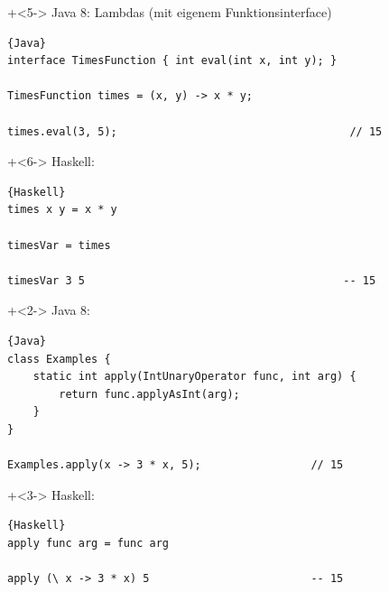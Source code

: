 \begin{frame}[fragile]{}
\onslide+<5->
Java 8: Lambdas (mit eigenem Funktionsinterface)
\begin{lstlisting}{Java}
interface TimesFunction { int eval(int x, int y); }

TimesFunction times = (x, y) -> x * y;

times.eval(3, 5);                                    // 15
\end{lstlisting}
\onslide+<6->
Haskell:
\begin{lstlisting}{Haskell}
times x y = x * y

timesVar = times

timesVar 3 5                                        -- 15
\end{lstlisting}

\end{frame}

\begin{frame}[fragile]{}
\onslide+<2->
Java 8:
\begin{lstlisting}{Java}
class Examples { 
    static int apply(IntUnaryOperator func, int arg) { 
        return func.applyAsInt(arg); 
    }
}

Examples.apply(x -> 3 * x, 5);                 // 15
\end{lstlisting}

\onslide+<3->
Haskell:
\begin{lstlisting}{Haskell}
apply func arg = func arg

apply (\ x -> 3 * x) 5                         -- 15
\end{lstlisting}

\end{frame}


